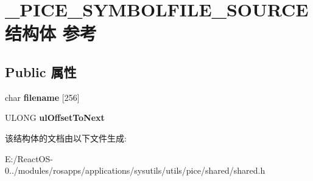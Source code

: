 \hypertarget{struct___p_i_c_e___s_y_m_b_o_l_f_i_l_e___s_o_u_r_c_e}{}\section{\+\_\+\+P\+I\+C\+E\+\_\+\+S\+Y\+M\+B\+O\+L\+F\+I\+L\+E\+\_\+\+S\+O\+U\+R\+C\+E结构体 参考}
\label{struct___p_i_c_e___s_y_m_b_o_l_f_i_l_e___s_o_u_r_c_e}
\subsection*{Public 属性}
\begin{DoxyCompactItemize}
\item 
\mbox{\label{struct___p_i_c_e___s_y_m_b_o_l_f_i_l_e___s_o_u_r_c_e_af85a869bc8babd644cf7cb98c6353dc9}} 
char {\bfseries filename} \mbox{[}256\mbox{]}
\item 
\mbox{\label{struct___p_i_c_e___s_y_m_b_o_l_f_i_l_e___s_o_u_r_c_e_a10d59330a650919f272e4dfd544da29b}} 
U\+L\+O\+NG {\bfseries ul\+Offset\+To\+Next}
\end{DoxyCompactItemize}


该结构体的文档由以下文件生成\+:\begin{DoxyCompactItemize}
\item 
E\+:/\+React\+O\+S-\/0../modules/rosapps/applications/sysutils/utils/pice/shared/shared.\+h\end{DoxyCompactItemize}
